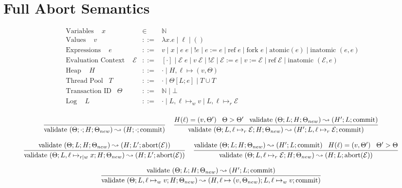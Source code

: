 \documentclass[9pt]{article}
\newcommand{\ctxt}[0]{\mathcal{E}}
\newcommand{\loc}[0]{\ell}
\newcommand{\atomic}[1]{\text{atomic}(#1)}
\newcommand{\alloc}[1]{\text{ref} \; #1}
\newcommand{\commit}[0]{\text{commit}}
\newcommand{\abort}[1]{\text{abort}(#1)}
\newcommand{\fork}[1]{\text{fork } #1}
\newcommand{\inatomic}[1]{\text{inatomic }(#1)}
\newcommand{\validate}[1]{\text{validate }(#1)}
\begin{document}
\section{Full Abort Semantics}
\begin{displaymath}
\begin{array}{rcll}
\text{Variables } \;\;\; x &\in& \mathbb{N} \\
\text{Values } \;\;\; v &::=& \lambda x. e \; | \; \loc \; | \; () \\
\text{Expressions } \;\;\; e &::=& v \; | \; x \; | \; e \; e \; | \; !e \; | \; e := e \; | \; \alloc{e} \; | \; \fork{e} \; | \; \atomic{e} \; | \; \inatomic{e, e}\\
\text{Evaluation Context } \;\;\; \ctxt &::=& [\cdot] \; | \; \ctxt \; e \; | \; v \; \ctxt \; | \; ! \ctxt \; | \; \ctxt := e \; | \; v := \ctxt \; | \; \alloc{\ctxt} \; | \; \inatomic{\ctxt, e}\\
\text{Heap } \;\;\; H &::=& \cdot \; | \; H, \loc \mapsto (v, \Theta) \\
\text{Thread Pool} \;\;\; T &::=& \cdot \; | \; \Theta[L; e] \; | \; T \cup T \\
\text{Transaction ID} \;\;\; \Theta &::=& \mathbb{N} \; | \; \bot \\
\text{Log } \;\;\; L &::=& \cdot \; | \; L, \loc \mapsto_w v \; | \; L, \loc \mapsto_r \ctxt \\
\end{array}
\end{displaymath}

\[
\infer[]{\validate{\Theta; \cdot; H; \Theta_{new}} \leadsto (H; \cdot; \commit)}{} \;\;\;
\infer[]{\validate{\Theta; L, \loc \mapsto_r \ctxt; H; \Theta_{new}} \leadsto (H'; L, \loc \mapsto_r \ctxt; \commit)}{H(\loc) = (v, \Theta') \;\;\; \Theta > \Theta' \;\;\; \validate{\Theta; L; H; \Theta_{new}} \leadsto (H'; L; \commit)}
\]

\[
\infer[]{\validate{\Theta; L, \loc \mapsto_{r|w} x; H; \Theta_{new}} \leadsto (H; L'; \abort{\ctxt})}{\validate{\Theta; L; H; \Theta_{new}} \leadsto (H; L'; \abort{\ctxt})} \;\;\;
\infer[]{\validate{\Theta; L, \loc \mapsto_r \ctxt; H; \Theta_{new}} \leadsto (H; L; \abort{\ctxt})}{\validate{\Theta; L; H; \Theta_{new}} \leadsto (H'; L; \commit) \;\;\; H(\loc) = (v, \Theta') \;\;\; \Theta' > \Theta}
\]

\[
\infer[]{\validate{\Theta; L, \loc \mapsto_w v; H; \Theta_{new}} \leadsto (H, \loc \mapsto (v, \Theta_{new}); L, \loc \mapsto_w v; \commit)}{\validate{\Theta; L; H; \Theta_{new}} \leadsto (H'; L; \commit)}
\]
\end{document}
